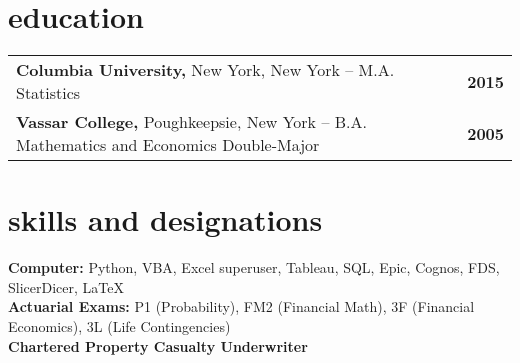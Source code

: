 \documentclass{article}
\begin{document}
	\section{education}
	\begin{tabular*}{\textwidth}{@{\extracolsep{\fill}}lr}
		\textbf{Columbia University,} New York, New York – M.A. Statistics & \textbf{2015} \\
		\textbf{Vassar College,} Poughkeepsie, New York – B.A. Mathematics and Economics Double-Major & \textbf{2005}
	\end{tabular*}
	\section{skills and designations}
	\textbf{Computer:}  Python, VBA, Excel superuser, Tableau, SQL, Epic, Cognos, FDS, SlicerDicer, LaTeX \\ 
	\textbf{Actuarial Exams:}  P1 (Probability), FM2 (Financial Math), 3F (Financial Economics), 3L (Life Contingencies) \\
	\textbf{Chartered Property Casualty Underwriter}
\end{document}
